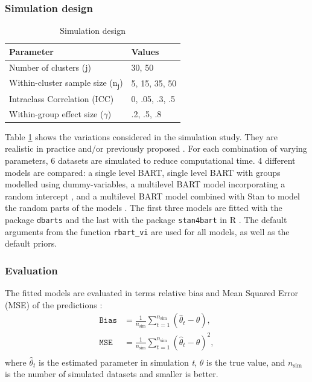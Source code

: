 \documentclass[10pt, a4paper, titlepage]{article}
\begin{document}
\subsubsection{Simulation design}
\begin{table}
\centering
\caption{Simulation design}
\label{tab:simulationparameters}
\begin{tabular}{l|l}
\textbf{Parameter}                                  & \textbf{Values} \\ \hline
Number of clusters (j)                              & 30, 50          \\
Within-cluster sample size (n\textsubscript{j})     & 5, 15, 35, 50   \\
Intraclass Correlation (ICC)                        & 0, .05, .3, .5  \\
Within-group effect size ($\gamma$)                 & .2, .5, .8
\end{tabular}
\end{table}

Table \ref{tab:simulationparameters} shows the variations considered in the simulation study. They are realistic in practice and/or previously proposed \citep{gulliford1999, murray2003, hox2017, grund2018, enders2018a, enders2020}. For each combination of varying parameters, 6 datasets are simulated to reduce computational time. 4 different models are compared: a single level BART, single level BART with groups modelled using dummy-variables, a multilevel BART model incorporating a random intercept \citep{chen2020, wagner2020, tan2016, wundervald2022}, and a multilevel BART model combined with Stan to model the random parts of the models \citep{dorie2022}. The first three models are fitted with the package \texttt{dbarts} \citep{dorie2023} and the last with the package \texttt{stan4bart} \citep{dorie2023a} in R \citep{rcoreteam2023}. The default arguments from the function \texttt{rbart\_vi} are used for all models, as well as the default priors.

\subsubsection{Evaluation}
The fitted models are evaluated in terms relative bias and Mean Squared Error (MSE) of the predictions \citep{morris2019}:
\begin{subequations}
\label{eq:evaluations}
\begin{align}
\texttt{Bias} &= \frac{1}{n_{\text{sim}}} \sum_{t=1}^{n_{\text{sim}}} (\hat{\theta}_t - \theta), \tag{5} \\
\texttt{MSE} &= \frac{1}{n_{\text{sim}}} \sum_{t=1}^{n_{\text{sim}}} (\hat{\theta}_t - \theta)^{2}, \tag{6} \\
\end{align}
\end{subequations}
where $\hat{\theta}_t$ is the estimated parameter in simulation \textit{t}, $\theta$ is the true value, and $n_{\text{sim}}$ is the number of simulated datasets and smaller is better.
\end{document}
